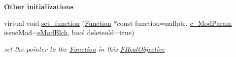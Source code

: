 \begin{Indent}\textbf{ Other initializations}\par
\begin{DoxyCompactItemize}
\item 
virtual void \mbox{\hyperlink{class_s_m_spp__di__unipi__it_1_1_f_real_objective_a91173cc091286d4bc102d8f54d564c1e}{set\+\_\+function}} (\mbox{\hyperlink{class_s_m_spp__di__unipi__it_1_1_function}{Function}} $\ast$const function=nullptr, \mbox{\hyperlink{group___modification___t_y_p_e_s_ga544246d8c462e9a2d817c2c30797968f}{c\+\_\+\+Mod\+Param}} issue\+Mod=\mbox{\hyperlink{group___modification___t_y_p_e_s_gga48fddcdd03a03f49b7e389ca1ed938d4a21b14b26b1c0093a0905f6fc010bad29}{e\+Mod\+Blck}}, bool deleteold=true)
\begin{DoxyCompactList}\small\item\em set the pointer to the \mbox{\hyperlink{class_s_m_spp__di__unipi__it_1_1_function}{Function}} in this \mbox{\hyperlink{class_s_m_spp__di__unipi__it_1_1_f_real_objective}{F\+Real\+Objective}} \end{DoxyCompactList}\end{DoxyCompactItemize}
\end{Indent}
